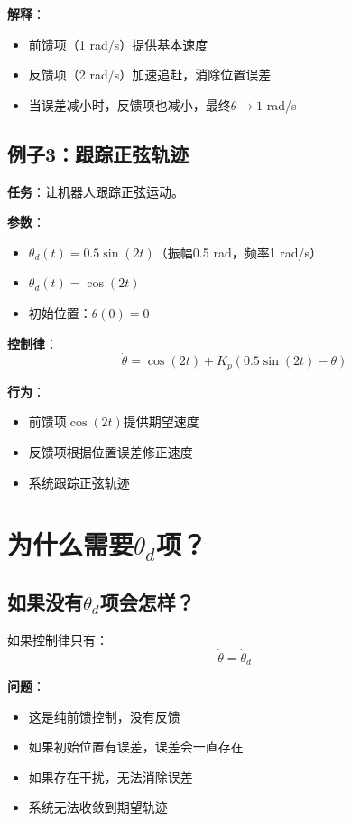 \documentclass[12pt,a4paper]{article}
\begin{document}
\textbf{解释}：
\begin{itemize}
\item 前馈项（1 rad/s）提供基本速度
\item 反馈项（2 rad/s）加速追赶，消除位置误差
\item 当误差减小时，反馈项也减小，最终$\dot{\theta} \to 1$ rad/s
\end{itemize}

\subsection{例子3：跟踪正弦轨迹}

\textbf{任务}：让机器人跟踪正弦运动。

\textbf{参数}：
\begin{itemize}
\item $\theta_d(t) = 0.5 \sin(2t)$（振幅0.5 rad，频率1 rad/s）
\item $\dot{\theta}_d(t) = \cos(2t)$
\item 初始位置：$\theta(0) = 0$
\end{itemize}

\textbf{控制律}：
\begin{equation}
\dot{\theta} = \cos(2t) + K_p(0.5\sin(2t) - \theta)
\end{equation}

\textbf{行为}：
\begin{itemize}
\item 前馈项$\cos(2t)$提供期望速度
\item 反馈项根据位置误差修正速度
\item 系统跟踪正弦轨迹
\end{itemize}

\section{为什么需要$\theta_d$项？}

\subsection{如果没有$\theta_d$项会怎样？}

如果控制律只有：
\begin{equation}
\dot{\theta} = \dot{\theta}_d
\end{equation}

\textbf{问题}：
\begin{itemize}
\item 这是纯前馈控制，没有反馈
\item 如果初始位置有误差，误差会一直存在
\item 如果存在干扰，无法消除误差
\item 系统无法收敛到期望轨迹
\end{itemize}
\end{document}
